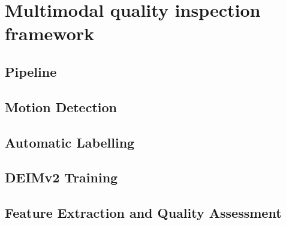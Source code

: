 
\chapter{Multimodal quality inspection framework}

\section{Pipeline}


\section{Motion Detection}


\section{Automatic Labelling}


\section{DEIMv2 Training}


\section{Feature Extraction and Quality Assessment}

